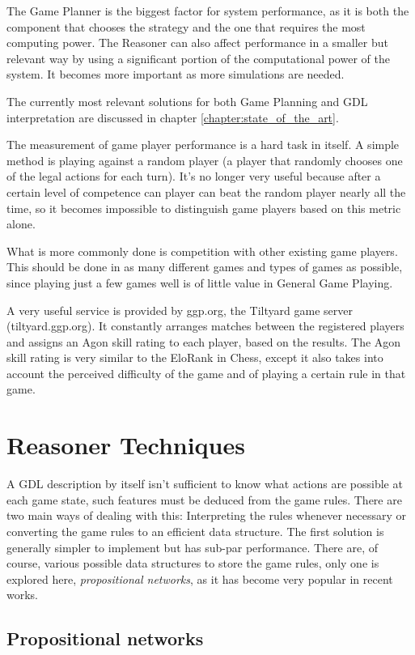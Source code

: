The Game Planner is the biggest factor for system performance, as it is both the component that chooses the strategy and the one that requires the most computing power. The Reasoner can also affect performance in a smaller but relevant way by using a significant portion of the computational power of the system. It becomes more important as more simulations are needed.

The currently most relevant solutions for both Game Planning and GDL interpretation are discussed in chapter \ref{chapter:state_of_the_art}.

The measurement of game player performance is a hard task in itself. A simple method is playing against a random player (a player that randomly chooses one of the legal actions for each turn). It's no longer very useful because after a certain level of competence can player can beat the random player nearly all the time, so it becomes impossible to distinguish game players based on this metric alone.

What is more commonly done is competition with other existing game players. This should be done in as many different games and types of games as possible, since playing just a few games well is of little value in General Game Playing.

A very useful service is provided by ggp.org, the Tiltyard game server (tiltyard.ggp.org). It constantly arranges matches between the registered players and assigns an Agon skill rating to each player, based on the results. The Agon skill rating is very similar to the EloRank in Chess, except it also takes into account the perceived difficulty of the game and of playing a certain rule in that game.


\section{Reasoner Techniques}
A \gls{GDL} description by itself isn't sufficient to know what actions are possible at each game state, such features must be deduced from the game rules.
There are two main ways of dealing with this:
Interpreting the rules whenever necessary or converting the game rules to an efficient data structure. The first solution is generally simpler to implement but has sub-par performance. There are, of course, various possible data structures to store the game rules, only one is explored here, \textit{propositional networks}, as it has become very popular in recent works.


\subsection{Propositional networks}

